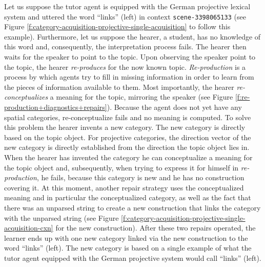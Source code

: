 Let us suppose the tutor agent is equipped with the German projective 
lexical system and uttered the word ``links'' (left) in context {\footnotesize\tt scene-3398065133} 
(see Figure \ref{f:category-acquisition-projective-single-acquisition} 
to follow this example). Furthermore, let us suppose
the hearer, a student, has no knowledge of this word and, consequently, the interpretation
process fails. The hearer then waits for the speaker to point to the topic.
Upon observing the speaker point to the topic, the hearer \emph{re-produces}
for the now known topic. \emph{Re-production} is a process by which agents try to fill 
in missing information in order to learn from the pieces of information available to them. 
Most importantly, the hearer \emph{re-conceptualizes}
a meaning for the topic, mirroring the speaker (see Figure \ref{f:re-production+diagnostics+repairs}). 
Because the agent does not yet have any spatial categories, re-conceptualize fails and 
no meaning is computed. To solve this problem the hearer invents a new category. 
The new category is directly based on the topic object. For projective categories, 
the direction vector of the new category is directly 
established from the direction the topic object lies in. When the hearer has invented 
the category he can conceptualize a meaning for the topic object and, subsequently, when trying to 
express it for himself in \emph{re-production}, he fails, because this category is new
and he has no construction covering it. At this moment, another
repair strategy uses the conceptualized meaning and in particular the conceptualized
category, as well as the fact that there was an unparsed string to create a new 
construction that links the category with the unparsed string 
(see Figure \ref{f:category-acquisition-projective-single-acquisition-cxn} for
the new construction). After these two repairs operated, 
the learner ends up with one new category linked via the new construction to the 
word ``links'' (left). The new category is based on a single example of what 
the tutor agent equipped with the German projective system would call ``links'' (left).

